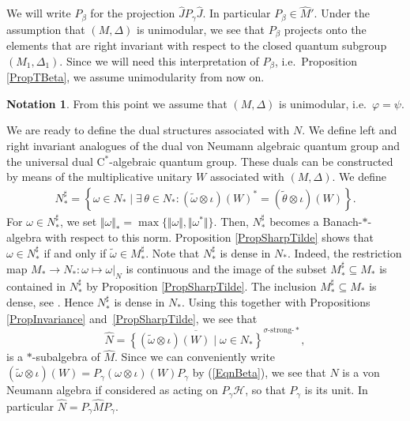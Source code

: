 \documentclass[11pt]{article}
\numberwithin{equation}{section}
\theoremstyle{definition}
\newtheorem{nt}[thm]{Notation}
\newcommand{\cHil}{\mathcal{H}}
\begin{document}
We will write $P_\beta$ for the projection $\hat{J} P_\gamma \hat{J}$. In particular $P_\beta \in \hat{M}'$. Under the assumption that $(M, \Delta)$ is unimodular, we see that $P_\beta$ projects onto the elements that are right invariant with respect to the closed quantum subgroup $(M_1 ,\Delta_1)$. Since we will need this interpretation of $P_\beta$, i.e.\ Proposition \ref{PropTBeta}, we assume unimodularity from now on.

\begin{nt}\label{NtUnimodular}
From this point we assume that $(M, \Delta)$ is unimodular, i.e.\ $\varphi = \psi$.
\end{nt}

We are ready to def\/ine the dual structures associated with $N$. We def\/ine left and right invariant analogues of the dual von Neumann algebraic quantum group and the universal dual C$^\ast$-algebraic quantum group. These duals can be constructed by means of the multiplicative unitary $W$ associated with $(M, \Delta)$. We def\/ine
\begin{gather*}%
N_\ast^\sharp = \left\{\omega \in N_\ast \mid \exists\, \theta \in N_\ast: (\tilde{\omega} \otimes \iota)(W)^\ast = (\tilde{\theta} \otimes \iota)(W) \right\}.
\end{gather*}
For $\omega \in N_\ast^\sharp$, we set $\Vert \omega \Vert_\ast = \max \{ \Vert \omega \Vert, \Vert \omega^\ast \Vert \}$. Then, $N_\ast^\sharp$ becomes a Banach-$\ast$-algebra with respect to this norm. Proposition \ref{PropSharpTilde} shows that $\omega \in N_\ast^\sharp$ if and only if $\tilde{\omega} \in M_\ast^\sharp$. Note that  $N_\ast^\sharp$ is dense in $N_\ast$. Indeed, the restriction map $M_\ast \rightarrow N_\ast: \omega \mapsto \omega\vert_N$  is continuous and the image of the subset $M_\ast^\sharp \subseteq M_\ast$ is contained in $N_\ast^\sharp$ by Proposition \ref{PropSharpTilde}. The inclusion $M_\ast^\sharp  \subseteq M_\ast$ is dense, see  \cite[Lemma 2.5]{KusVaeII}. Hence $N_\ast^\sharp$ is dense in $N_\ast$. Using this together with Propositions \ref{PropInvariance} and~\ref{PropSharpTilde}, we see that
\[
\hat{N} = \overline{\left\{ (\tilde{\omega} \otimes \iota)(W) \mid \omega \in N_\ast \right\}}^{\sigma\text{-strong-}\ast},
\]
is a $\ast$-subalgebra of $\hat{M}$. Since we can conveniently write
$
(\tilde{\omega} \otimes \iota)(W) = P_\gamma (\omega \otimes \iota)(W) P_\gamma
$
by (\ref{EqnBeta}),
 we see that $\hat{N}$ is a von Neumann algebra if considered as acting on $P_\gamma \cHil$, so that $P_\gamma$ is its unit. In particular $\hat{N} = P_\gamma \hat{M} P_\gamma$.
\end{document}
